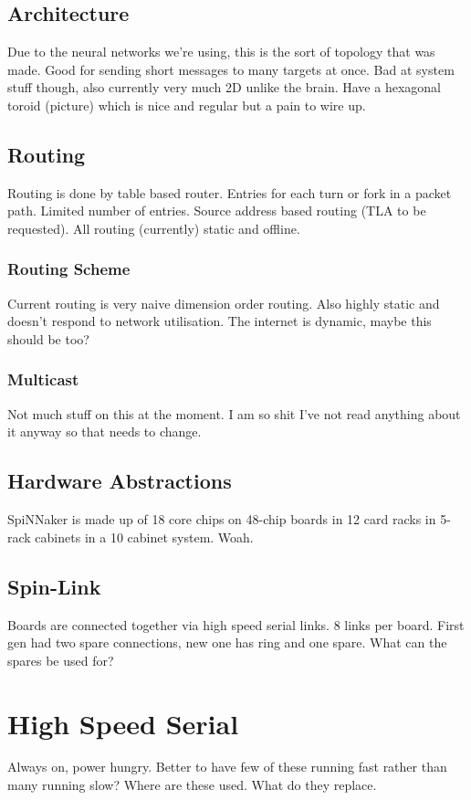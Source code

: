 		\subsection{Architecture}
			
			Due to the neural networks we're using, this is the sort of topology that
			was made. Good for sending short messages to many targets at once. Bad at
			system stuff though, also currently very much 2D unlike the brain. Have a
			hexagonal toroid (picture) which is nice and regular but a pain to wire up.
		
		\subsection{Routing}
			
			Routing is done by table based router. Entries for each turn or fork in a
			packet path. Limited number of entries. Source address based routing (TLA
			to be requested). All routing (currently) static and offline.
			
			\subsubsection{Routing Scheme}
				
				Current routing is very naive dimension order routing. Also highly
				static and doesn't respond to network utilisation. The internet is
				dynamic, maybe this should be too?
			
			\subsubsection{Multicast}
				
				Not much stuff on this at the moment. I am so shit I've not read
				anything about it anyway so that needs to change.
			
		
		\subsection{Hardware Abstractions}
			
			SpiNNaker is made up of 18 core chips on 48-chip boards in 12 card racks
			in 5-rack cabinets in a 10 cabinet system. Woah.
		
		\subsection{Spin-Link}
			
			Boards are connected together via high speed serial links. 8 links per
			board. First gen had two spare connections, new one has ring and one
			spare. What can the spares be used for?
	
	
	\section{High Speed Serial}
		
		Always on, power hungry. Better to have few of these running fast rather
		than many running slow? Where are these used. What do they replace.
